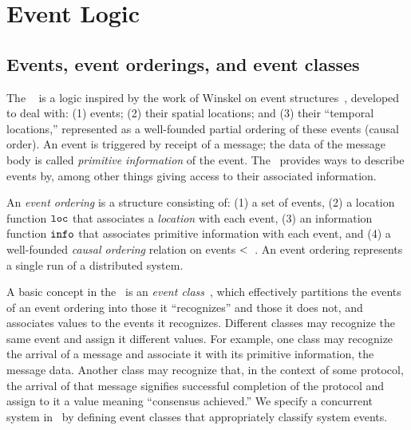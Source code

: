 \documentclass[final]{article}
\begin{document}



\section{Event Logic}

\subsection{Events, event orderings, and event classes}

The \logicE~\cite{Bickford:2009,Bickford+Constable:2008} is a logic
inspired by the work of Winskel on event
structures~\cite{Winskel:1988}, developed to deal with: (1) events;
(2) their spatial locations; and (3) their ``temporal locations,''
represented as a well-founded partial ordering of these events (causal
order).
%
An event is triggered by receipt of a message; the data of the message
body is called \emph{primitive information\/} of the event.
%
The \logicE\ provides ways to describe events by, among other things
giving access to their associated information.

An \emph{event ordering} is a structure consisting of: (1) a set of
events, (2) a location function $\mathtt{loc}$ that associates a
\emph{location} with each event, (3) an information function
$\mathtt{info}$ that associates primitive information with each
event, and (4) a well-founded \emph{causal ordering} relation on
events $<$~\cite{Lamport:1978}.  An event ordering
represents a single run of a distributed system.

A basic concept in the \logicE\ is an \emph{event
  class}~\cite{Bickford:2009}, which effectively partitions the events
of an event ordering into those it ``recognizes'' and those it does
not, and associates values to the events it recognizes.  Different
classes may recognize the same event and assign it different values.
For example, one class may recognize the arrival of a message and
associate it with its primitive information, the message data.
Another class may recognize that, in the context of some protocol, the
arrival of that message signifies successful completion of the
protocol and assign to it a value meaning ``consensus achieved.''  We
specify a concurrent system in \eml\ by defining event classes that
appropriately classify system events.
\end{document}
